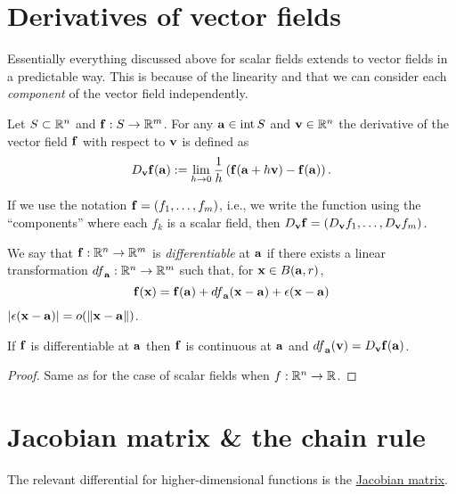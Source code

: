 \section{Derivatives of vector fields}

Essentially everything discussed above for scalar fields extends to vector fields in a predictable way.
This is because of the linearity and that we can consider each \emph{component} of the vector field independently.

\begin{definition}
    Let \(S\subset \bR^n\) and \(\ff:S\to \bR^m\).
    For any \(\aa \in \operatorname{int}S\) and \(\vv \in \bR^n\) the derivative of the vector field \(\ff\) with respect to \(\vv\) is defined as
    \[
        D_{\vv}\ff(\aa) :=
        \lim_{h\to 0} \frac{1}{h} \left(\ff(\aa+h \vv) - \ff(\aa)\right).
    \]
\end{definition}

\begin{remark}
    If we use the notation \(\ff = (f_1,\ldots,f_m)\), i.e., we write the function using the ``components'' where each \(f_k\) is a scalar field, then \(D_{\vv}\ff = (D_{\vv}f_1,\ldots,D_{\vv} f_m)\).
\end{remark}


\begin{definition*}[differentiable]
    We say that \(\ff: \bR^n \to \bR^m\) is \emph{differentiable} at \(\aa\) if there exists a linear transformation \({df}_{\aa}: \bR^n \to \bR^m\) such that, for \(\xx \in B(\aa,r)\),
    \[
        \ff(\xx) = \ff(\aa) + {df}_{\aa}(\xx-\aa) + \epsilon(\xx-\aa)
    \]
    \(\abs{\epsilon(\xx-\aa)} = \littleo{\norm{\xx-\aa}}\).
\end{definition*}


\begin{theorem}
    If \(\ff\) is differentiable at \(\aa\)
    then \(\ff\) is continuous at \(\aa\)
    and \( {df}_{\aa}(\vv) =D_{\vv}\ff(\aa) \).
\end{theorem}

\begin{proof}
    Same as for the case of scalar fields when \(f:\bR^n \to \bR\).
\end{proof}


\section{Jacobian matrix \& the chain rule}

The relevant differential for higher-dimensional functions is the \href{https://en.wikipedia.org/wiki/Jacobian_matrix_and_determinant}{Jacobian matrix}.

